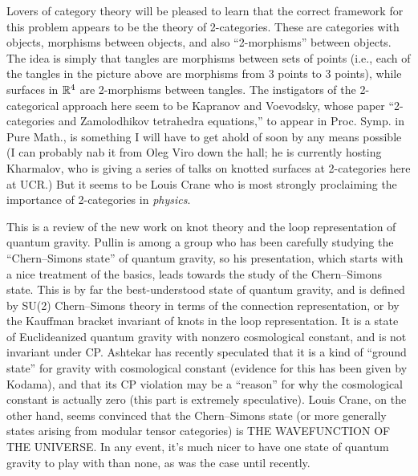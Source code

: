 Lovers of category theory will be pleased to learn that the correct framework for this problem appears to be the theory of 2-categories. These are categories with objects, morphisms between objects, and also ``2-morphisms'' between objects. The idea is simply that tangles are morphisms between sets of points (i.e., each of the tangles in the picture above are morphisms from 3 points to 3 points), while surfaces in $\mathbb R^4$ are 2-morphisms between tangles. The instigators of the 2-categorical approach here seem to be Kapranov and Voevodsky, whose paper ``2-categories and Zamolodhikov tetrahedra equations,'' to appear in Proc. Symp. in Pure Math., is something I will have to get ahold of soon by any means possible (I can probably nab it from Oleg Viro down the hall; he is currently hosting Kharmalov, who is giving a series of talks on knotted surfaces at 2-categories here at UCR.) But it seems to be Louis Crane who is most strongly proclaiming the importance of 2-categories in \emph{physics}.


This is a review of the new work on knot theory and the loop representation of quantum gravity. Pullin is among a group who has been carefully studying the ``Chern--Simons state'' of quantum gravity, so his presentation, which starts with a nice treatment of the basics, leads towards the study of the Chern--Simons state. This is by far the best-understood state of quantum gravity, and is defined by SU(2) Chern--Simons theory in terms of the connection representation, or by the Kauffman bracket invariant of knots in the loop representation. It is a state of Euclideanized quantum gravity with nonzero cosmological constant, and is not invariant under CP. Ashtekar has recently speculated that it is a kind of ``ground state'' for gravity with cosmological constant (evidence for this has been given by Kodama), and that its CP violation may be a ``reason'' for why the cosmological constant is actually zero (this part is extremely speculative). Louis Crane, on the other hand, seems convinced that the Chern--Simons state (or more generally states arising from modular tensor categories) is THE WAVEFUNCTION OF THE UNIVERSE. In any event, it's much nicer to have one state of quantum gravity to play with than none, as was the case until recently.

